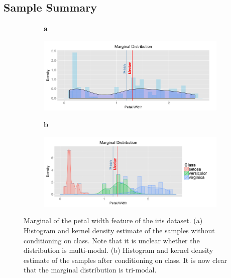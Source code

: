 \documentclass[review]{siamart0516}
\begin{document}
\subsection{Sample Summary}
\label{subsec:SubSecSample}

\begin{figure}[t!]
	\centering
	\begin{subfigure}[t]{0.01\textwidth}
		\textbf{a}
	\end{subfigure}
	\begin{subfigure}[t]{0.48\textwidth}
		\includegraphics[width=\textwidth,valign=t]{Figures/Iris/MarginalPetalWidthnocond.png}
		\subcaption{}
		\label{fig:FigMarginalNoCond}
	\end{subfigure}\hfill
	\begin{subfigure}[t]{0.01\textwidth}
		\textbf{b}
	\end{subfigure}
	\begin{subfigure}[t]{0.48\textwidth}
		\includegraphics[width=\textwidth,valign=t]{Figures/Iris/MarginalPetalWidth.png}
		\subcaption{}
		\label{fig:FigMarginal}
	\end{subfigure}
	\vspace{-1.5\baselineskip}
	\caption{Marginal of the petal width feature of the iris dataset. (a) Histogram and kernel density estimate of the samples without conditioning on class. Note that it is unclear whether the distribution is multi-modal. (b) Histogram and kernel density estimate of the samples after conditioning on class. It is now clear that the marginal distribution is tri-modal.}
	\label{fig:FigSample}
\end{figure}
\end{document}
